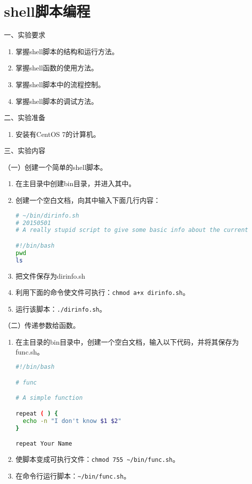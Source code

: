 \chapter{shell脚本编程}

\noindent
一、实验要求
\begin{enumerate}
  \item 掌握shell脚本的结构和运行方法。
  \item 掌握shell函数的使用方法。
  \item 掌握shell脚本中的流程控制。
  \item 掌握shell脚本的调试方法。
\end{enumerate}

\vspace{0.2in}
\noindent
二、实验准备
\begin{enumerate}
  \item 安装有CentOS 7的计算机。
\end{enumerate}

\vspace{0.2in}
\noindent
三、实验内容

\vspace{0.1in}
（一）创建一个简单的shell脚本。
\begin{enumerate}
  \item 在主目录中创建bin目录，并进入其中。
  \item 创建一个空白文档，向其中输入下面几行内容：
\begin{lstlisting}[language=bash]
# ~/bin/dirinfo.sh
# 20150501
# A really stupid script to give some basic info about the current directory

#!/bin/bash
pwd
ls
\end{lstlisting}
  \item 把文件保存为dirinfo.sh
  \item 利用下面的命令使文件可执行：\verb|chmod a+x dirinfo.sh|。
  \item 运行该脚本：\verb|./dirinfo.sh|。
\end{enumerate}

\vspace{0.1in}
（二）传递参数给函数。
\begin{enumerate}
  \item 在主目录的bin目录中，创建一个空白文档，输入以下代码，并将其保存为func.sh。
\begin{lstlisting}[language=bash]
#!/bin/bash

# func

# A simple function

repeat ( ) {
  echo -n "I don't know $1 $2"
}

repeat Your Name
\end{lstlisting}
  \item 使脚本变成可执行文件：\verb|chmod 755 ~/bin/func.sh|。
  \item 在命令行运行脚本：\verb|~/bin/func.sh|。
\end{enumerate}


